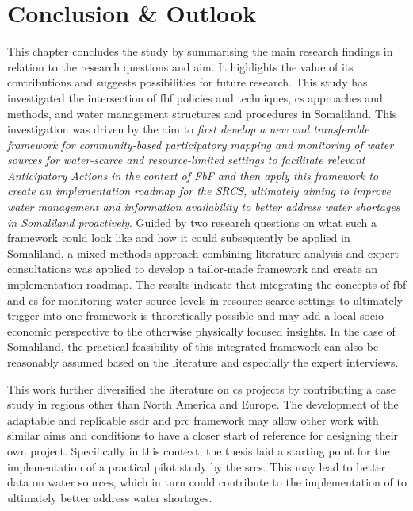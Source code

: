 \chapter{Conclusion \& Outlook}

\label{chapter6}

This chapter concludes the study by summarising the main research findings in relation to the research questions and aim. It highlights the value of its contributions and suggests possibilities for future research.\newline
This study has investigated the intersection of \acrfull{fbf} policies and techniques, \acrfull{cs} approaches and methods, and water management structures and procedures in Somaliland. This investigation was driven by the aim to \textit{first develop a new and transferable framework for community-based participatory mapping and monitoring of water sources for water-scarce and resource-limited settings to facilitate relevant Anticipatory Actions in the context of FbF and then apply this framework to create an implementation roadmap for the SRCS, ultimately aiming to improve water management and information availability to better address water shortages in Somaliland proactively}.\newline
Guided by two research questions on what such a framework could look like and how it could subsequently be applied in Somaliland, a mixed-methods approach combining literature analysis and expert consultations was applied to develop a tailor-made framework and create an implementation roadmap. The results indicate that integrating the concepts of \acrshort{fbf} and \acrshort{cs} for monitoring water source levels in resource-scarce settings to ultimately trigger  into one framework is theoretically possible and may add a local socio-economic perspective to the otherwise physically focused insights. In the case of Somaliland, the practical feasibility of this integrated framework can also be reasonably assumed based on the literature and especially the expert interviews.\newline

This work further diversified the literature on \acrlong{cs} projects by contributing a case study in regions other than North America and Europe. The development of the adaptable and replicable \acrlong{ssdr} and \acrlong{prc} framework may allow other work with similar aims and conditions to have a closer start of reference for designing their own project. Specifically in this context, the thesis laid a starting point for the implementation of a practical pilot study by the \acrlong{srcs}. This may lead to better data on water sources, which in turn could contribute to the implementation of  to ultimately better address water shortages.\newline


